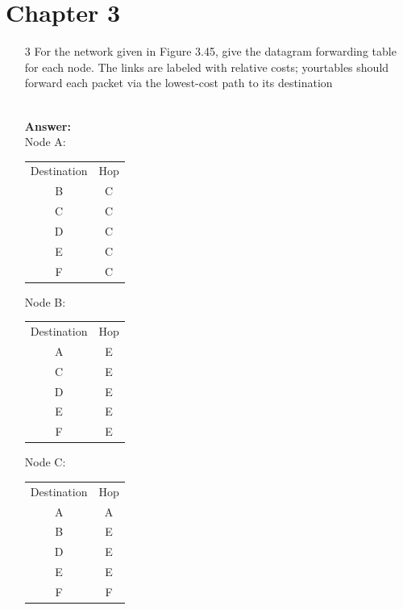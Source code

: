 \documentclass[a4paper]{article}
\begin{document}
\section*{Chapter 3}
\begin{itemize}
	\item[3] For the network given in Figure 3.45, give the datagram forwarding table for each node. The links are labeled with relative costs; yourtables should forward each packet via the lowest-cost path to its destination \\
	        \\
	      \textbf{Answer:} \\
	      Node A: \begin{tabular}{c|c}
	      Destination & Hop \\
	      B & C \\
	      C & C \\
	      D & C \\
	      E & C \\
	      F & C \\
	\end{tabular}
	Node B: \begin{tabular}{c|c}
	Destination & Hop \\
	A & E \\
	C & E \\
	D & E \\
	E & E \\
	F & E \\
	\end{tabular}
	Node C: \begin{tabular}{c|c}
	Destination & Hop \\
	A & A \\
	B & E \\
	D & E \\
	E & E \\
	F & F \\
	\end{tabular} \\

\end{itemize}
\end{document}

